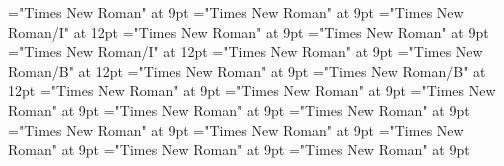 \documentclass[gps1,twoside]{article}
\begin{document}
\font\spanspanlexsensereferencessensesensessubentrysubentriesentrybefore="Times New Roman" at 9pt
\font\lexsensereferencessensesensessubentrysubentriesentryafter="Times New Roman" at 9pt
\font\spanenownertypeabbreviationlexsensereferencelexsensereferencessensesensessubentrysubentriesentry="Times New Roman/I" at 12pt
\font\spanspanownertypeabbreviationlexsensereferencelexsensereferencessensesensessubentrysubentriesentrybefore="Times New Roman" at 9pt
\font\spanownertypeabbreviationlexsensereferencelexsensereferencessensesensessubentrysubentriesentrylastchildafter="Times New Roman" at 9pt
\font\spanownertypeabbreviationlexsensereferencelexsensereferencessensesensessubentrysubentriesentry="Times New Roman/I" at 12pt
\font\configtargetconfigtargetconfigtargetslexsensereferencelexsensereferencessensesensessubentrysubentriesentrybefore="Times New Roman" at 9pt
\font\spanbzhheadwordconfigtargetconfigtargetslexsensereferencelexsensereferencessensesensessubentrysubentriesentry="Times New Roman/B" at 12pt
\font\spanspanheadwordconfigtargetconfigtargetslexsensereferencelexsensereferencessensesensessubentrysubentriesentrybefore="Times New Roman" at 9pt
\font\spanheadwordconfigtargetconfigtargetslexsensereferencelexsensereferencessensesensessubentrysubentriesentry="Times New Roman/B" at 12pt
\font\variantformentrybackrefvariantformentrybackrefvariantformentrybackrefssensesensessubentrysubentriesentrybefore="Times New Roman" at 9pt
\font\variantformentrybackrefssensesensessubentrysubentriesentrybefore="Times New Roman" at 9pt
\font\variantformentrybackrefssensesensessubentrysubentriesentryafter="Times New Roman" at 9pt
\font\variantentrytypevariantentrytypevariantentrytypesvariantformentrybackrefvariantformentrybackrefssensesensessubentrysubentriesentrybefore="Times New Roman" at 9pt
\font\variantentrytypesvariantformentrybackrefvariantformentrybackrefssensesensessubentrysubentriesentryafter="Times New Roman" at 9pt
\font\spanspanreverseabbrvariantentrytypevariantentrytypesvariantformentrybackrefvariantformentrybackrefssensesensessubentrysubentriesentrybefore="Times New Roman" at 9pt
\font\spanreverseabbrvariantentrytypevariantentrytypesvariantformentrybackrefvariantformentrybackrefssensesensessubentrysubentriesentrylastchildafter="Times New Roman" at 9pt
\font\spanspanheadwordvariantformentrybackrefvariantformentrybackrefssensesensessubentrysubentriesentrybefore="Times New Roman" at 9pt
\font\spanspanowningentrysummarydefinitionvariantformentrybackrefvariantformentrybackrefssensesensessubentrysubentriesentrybefore="Times New Roman" at 9pt
\font\spanowningentrysummarydefinitionvariantformentrybackrefvariantformentrybackrefssensesensessubentrysubentriesentrylastchildafter="Times New Roman" at 9pt
\end{document}
